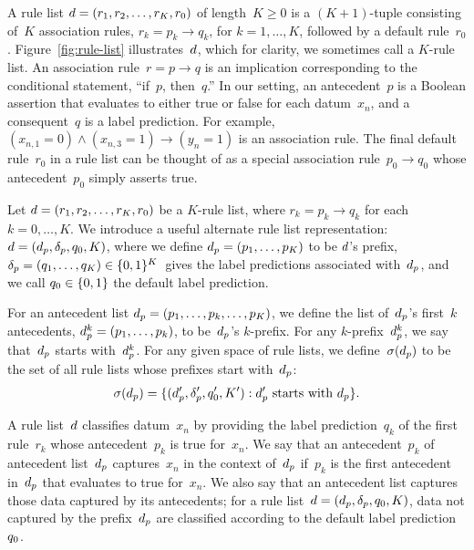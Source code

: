 A rule list ${{d} = (r_1, r_2, \dots, r_K, r_0)}$ of length~${K \ge 0}$
is a ${(K+1)}$-tuple consisting of~$K$ association rules,
${r_k = p_k \rightarrow q_k}$, for ${k = 1, \dots, K}$,
followed by a default rule~$r_0$.
%
Figure~\ref{fig:rule-list} illustrates~${d}$,
which for clarity, we sometimes call a $K$-rule list.
%
An association rule~${r = p \rightarrow q}$ is an implication
corresponding to the conditional statement, ``if~$p$, then~$q$.''
%
In our setting, an antecedent~$p$ is a Boolean assertion that
evaluates to either true or false for each datum~$x_n$,
and a consequent~$q$ is a label prediction.
%
For example, ${(x_{n, 1} = 0) \wedge (x_{n, 3} = 1) \rightarrow (y_n = 1)}$
is an association rule.
%
%
The final default rule~$r_0$ in a rule list can be thought of
as a special association rule~${p_0 \rightarrow q_0}$
whose antecedent~$p_0$ simply asserts true.

Let ${{d} = (r_1, r_2, \dots, r_K, r_0)}$ be a $K$-rule list,
where ${r_k = p_k \rightarrow q_k}$ for each ${k = 0, \dots, K}$.
%
We introduce a useful alternate rule list representation:
${{d} = (d_p, \delta_p, q_0, K)}$,
where we define ${d_p = (p_1, \dots, p_K)}$ to be ${d}$'s prefix,
${\delta_p = (q_1, \dots, q_K) \in \{0, 1\}^K}$~gives
the label predictions associated with~$d_p$,
and we call ${q_0 \in \{0, 1\}}$ the default label prediction.

For an antecedent list ${d_p = (p_1, \dots, p_k, \dots, p_K)}$,
we define the list of~$d_p$'s first~$k$ antecedents,
${d_p^k = (p_1, \dots, p_k)}$, to be~$d_p$'s $k$-prefix.
%
For any $k$-prefix~$d_p^k$,
we say that~$d_p$ starts with~$d_p^k$.
%
For any given space of rule lists,
we define~$\sigma(d_p)$ to be the set of
all rule lists whose prefixes start with~$d_p$:
\begin{align}
\StartsWith(\Prefix) =
\{(\Prefix', \Labels', \Default', K') : \Prefix' \textnormal{ starts with } \Prefix \}.
\end{align}

A rule list~${d}$ classifies datum~$x_n$ by providing the label prediction~$q_k$
of the first rule~$r_k$ whose antecedent~$p_k$ is true for~$x_n$.
%
We say that an antecedent~$p_k$ of antecedent list~$d_p$ captures~$x_n$
in the context of~$d_p$ if~$p_k$ is the first antecedent in~$d_p$ that
evaluates to true for~$x_n$.
%
We also say that an antecedent list captures those data captured by its antecedents;
for a rule list~${{d} = (d_p, \delta_p, q_0, K)}$,
data not captured by the prefix~$d_p$
are classified according to the default label prediction~$q_0$.

